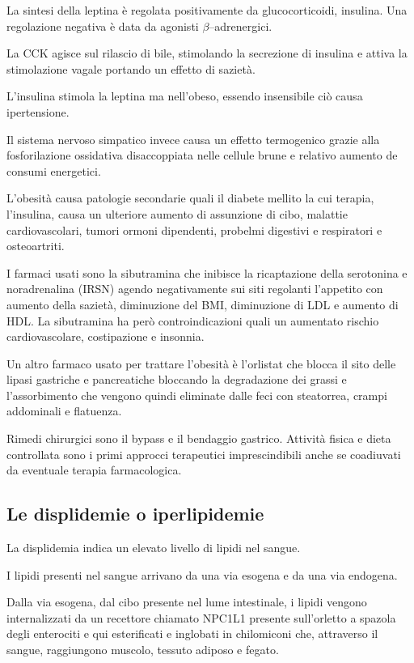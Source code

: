La sintesi della leptina è regolata positivamente da glucocorticoidi, insulina. Una regolazione negativa è data da agonisti $\beta$--adrenergici.

La CCK agisce sul rilascio di bile, stimolando la secrezione di insulina e attiva la stimolazione vagale portando un effetto di sazietà.

L'insulina stimola la leptina ma nell'obeso, essendo insensibile ciò causa ipertensione.

Il sistema nervoso simpatico invece causa un effetto termogenico grazie alla fosforilazione ossidativa disaccoppiata nelle cellule brune e relativo aumento de consumi energetici.

L'obesità causa patologie secondarie quali il diabete mellito la cui terapia, l'insulina, causa un ulteriore aumento di assunzione di cibo, malattie cardiovascolari, tumori ormoni dipendenti, probelmi digestivi e respiratori e osteoartriti.

I farmaci usati sono la sibutramina che inibisce la ricaptazione della serotonina e noradrenalina (IRSN) agendo negativamente sui siti regolanti l'appetito con aumento della sazietà, diminuzione del BMI, diminuzione di LDL e aumento di HDL. La sibutramina ha però controindicazioni quali un aumentato rischio cardiovascolare, costipazione e insonnia.

Un altro farmaco usato per trattare l'obesità è l'orlistat che blocca il sito delle lipasi gastriche e pancreatiche bloccando la degradazione dei grassi e l'assorbimento che vengono quindi eliminate dalle feci con steatorrea, crampi addominali e flatuenza.

Rimedi chirurgici sono il bypass e il bendaggio gastrico. Attività fisica e dieta controllata sono i primi approcci terapeutici imprescindibili anche se coadiuvati da eventuale terapia farmacologica.

\subsection{Le displidemie o iperlipidemie}

La displidemia indica un elevato livello di lipidi nel sangue. 

I lipidi presenti nel sangue arrivano da una via esogena e da una via endogena.

Dalla via esogena, dal cibo presente nel lume intestinale, i lipidi vengono internalizzati da un recettore chiamato NPC1L1 presente sull'orletto a spazola degli enterociti e qui esterificati e inglobati in chilomiconi che, attraverso il sangue, raggiungono muscolo, tessuto adiposo e fegato.

